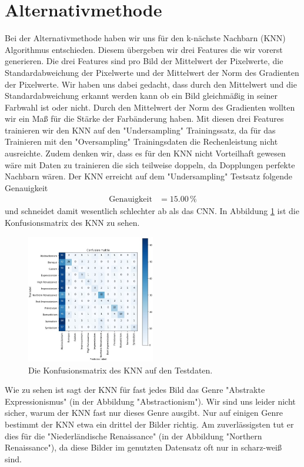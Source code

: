 \section{Alternativmethode}
\label{sec:alternativ}
Bei der Alternativmethode haben wir uns für den k-nächste Nachbarn (KNN) Algorithmus entschieden.
Diesem übergeben wir drei Features die wir vorerst generieren.
Die drei Features sind pro Bild der Mittelwert der Pixelwerte, die Standardabweichung der Pixelwerte und der Mittelwert der Norm des Gradienten der Pixelwerte.
Wir haben uns dabei gedacht, dass durch den Mittelwert und die Standardabweichung erkannt werden kann ob ein Bild gleichmäßig in seiner Farbwahl ist oder nicht.
Durch den Mittelwert der Norm des Gradienten wollten wir ein Maß für die Stärke der Farbänderung haben.
Mit diesen drei Features trainieren wir den KNN auf den "Undersampling" Trainingssatz, da für das Trainieren mit den "Oversampling" Trainingsdaten die Rechenleistung nicht ausreichte.
Zudem denken wir, dass es für den KNN nicht Vorteilhaft gewesen wäre mit Daten zu trainieren die sich teilweise doppeln, da Dopplungen perfekte Nachbarn wären.
Der KNN erreicht auf dem "Undersampling" Testsatz folgende Genauigkeit
\begin{align*}
    \text{Genauigkeit} &= 15.00\, \%
\end{align*}
und schneidet damit wesentlich schlechter ab als das CNN.
In Abbildung \ref{fig:alternativ} ist die Konfusionsmatrix des KNN zu sehen.
\begin{figure}
    \centering
    \includegraphics[width=0.5\textwidth]{content/data/alternativ.JPG}
    \caption{Die Konfusionsmatrix des KNN auf den Testdaten.}
    \label{fig:alternativ}
\end{figure}
Wie zu sehen ist sagt der KNN für fast jedes Bild das Genre "Abstrakte Expressionismus" (in der Abbildung "Abstractionism").
Wir sind uns leider nicht sicher, warum der KNN fast nur dieses Genre ausgibt.
Nur auf einigen Genre bestimmt der KNN etwa ein drittel der Bilder richtig.
Am zuverlässigsten tut er dies für die "Niederländische Renaissance" (in der Abbildung "Northern Renaissance"), da diese Bilder im genutzten Datensatz oft nur in scharz-weiß sind.
